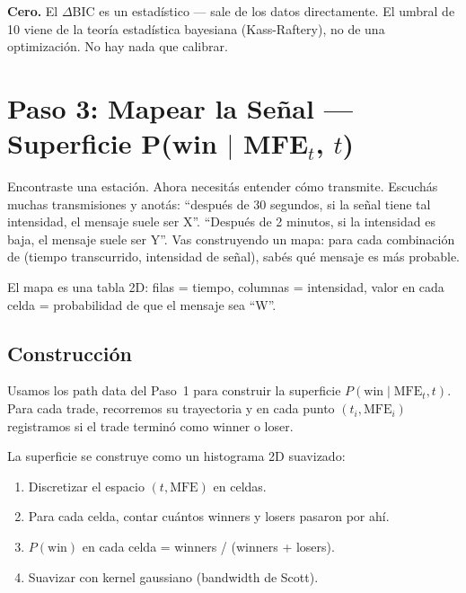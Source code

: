 \documentclass[11pt,a4paper]{article}
\newcommand{\pw}{P(\text{win})}
\begin{document}
\textbf{Cero.} El $\Delta$BIC es un estad\'istico --- sale de los datos
directamente. El umbral de 10 viene de la teor\'ia estad\'istica
bayesiana (Kass-Raftery), no de una optimizaci\'on. No hay nada que
calibrar.


\section{Paso 3: Mapear la Se\~nal --- Superficie P(win $|$ MFE$_t$, $t$)}
\label{sec:paso3}

\begin{tcolorbox}[radio, title=La radio: mapear la se\~nal]
Encontraste una estaci\'on. Ahora necesit\'as entender c\'omo
transmite. Escuch\'as muchas transmisiones y anot\'as: ``despu\'es
de 30 segundos, si la se\~nal tiene tal intensidad, el mensaje
suele ser X''. ``Despu\'es de 2 minutos, si la intensidad es
baja, el mensaje suele ser Y''. Vas construyendo un mapa: para
cada combinaci\'on de (tiempo transcurrido, intensidad de se\~nal),
sab\'es qu\'e mensaje es m\'as probable.

El mapa es una tabla 2D: filas = tiempo, columnas = intensidad,
valor en cada celda = probabilidad de que el mensaje sea ``W''.
\end{tcolorbox}

\subsection{Construcci\'on}

Usamos los path data del Paso~1 para construir la superficie
$P(\text{win} \mid \text{MFE}_t, t)$. Para cada trade, recorremos
su trayectoria y en cada punto $(t_i, \text{MFE}_i)$ registramos
si el trade termin\'o como winner o loser.

La superficie se construye como un histograma 2D suavizado:

\begin{enumerate}[leftmargin=2em]
\item Discretizar el espacio $(t, \text{MFE})$ en celdas.
\item Para cada celda, contar cu\'antos winners y losers pasaron por ah\'i.
\item $\pw$ en cada celda = winners / (winners + losers).
\item Suavizar con kernel gaussiano (bandwidth de Scott).
\end{enumerate}
\end{document}

